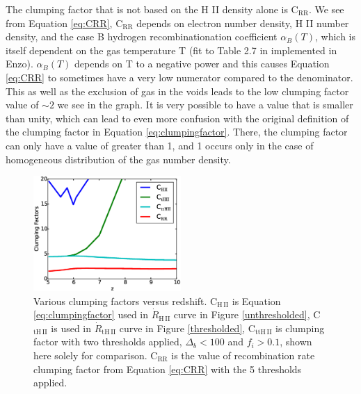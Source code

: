 The clumping factor that is not based on the H {\footnotesize II} density alone is C$_\mathrm{RR}$.  We see from Equation \eqref{eq:CRR}, C$_\mathrm{RR}$ depends on electron number density, H {\footnotesize II} number density, and the case B hydrogen recombinationation coefficient $\alpha_B(T)$, which is itself dependent on the gas temperature T (fit to Table 2.7 in \cite{OsterbrockFerland2006} implemented in Enzo).  $\alpha_B(T)$ depends on T to a negative power and this causes Equation \eqref{eq:CRR} to sometimes have a very low numerator compared to the denominator.  This as well as the exclusion of gas in the voids leads to the low clumping factor value of $\sim 2$ we see in the graph.  It is very possible to have a value that is smaller than unity, which can lead to even more confusion with the original definition of the clumping factor in Equation \eqref{eq:clumpingfactor}.  There, the clumping factor can only have a value of greater than 1, and 1 occurs only in the case of homogeneous distribution of the gas number density.

\begin{figure}
	\includegraphics[width=0.5\textwidth]{ClumpingFactors.eps}
	\caption{Various clumping factors versus redshift.  C$_\mathrm{H\,II}$ is Equation \eqref{eq:clumpingfactor} used in $\dot{R}_\mathrm{H\,II}$ curve in Figure \ref{unthresholded}, C$_\mathrm{tH\,II}$ is used in $\dot{R}_\mathrm{tH\,II}$ curve in Figure \ref{thresholded}, C$_\mathrm{ttH\,II}$ is clumping factor with two thresholds applied, $\Delta_b < 100$ and $f_i>0.1$, shown here solely for comparison.  C$_\mathrm{RR}$ is the value of recombination rate clumping factor from Equation \eqref{eq:CRR} with the 5 thresholds applied.}
	\label{ClumpingFactors}
\end{figure}

